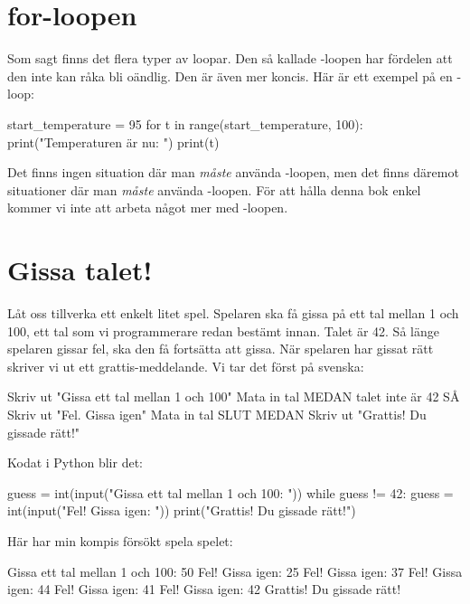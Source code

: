 \section{for-loopen}
Som sagt finns det flera typer av loopar. Den så kallade -loopen har fördelen att den inte kan råka bli oändlig. Den är även mer koncis. Här är ett exempel på en -loop:
\vspace{10pt}
\begin{python}
start_temperature = 95
for t in range(start_temperature, 100):
	print("Temperaturen är nu: ")
	print(t)
\end{python}

Det finns ingen situation där man \emph{måste} använda -loopen, men det finns däremot situationer där man \emph{måste} använda -loopen. För att hålla denna bok enkel kommer vi inte att arbeta något mer med -loopen.

\section{Gissa talet!}\label{subsec:gissa_talet1}
Låt oss tillverka ett enkelt litet spel. Spelaren ska få gissa på ett tal mellan 1 och 100, ett tal som vi programmerare redan bestämt innan. Talet är 42. Så länge spelaren gissar fel, ska den få fortsätta att gissa. När spelaren har gissat rätt skriver vi ut ett grattis-meddelande. Vi tar det först på svenska:

\begin{pseudo}
Skriv ut "Gissa ett tal mellan 1 och 100"
Mata in tal
MEDAN talet inte är 42 SÅ
   Skriv ut "Fel. Gissa igen"
   Mata in tal
SLUT MEDAN
Skriv ut "Grattis! Du gissade rätt!"
\end{pseudo}

Kodat i Python blir det:

\begin{python}[caption={Gissa talet},label={}]
guess = int(input("Gissa ett tal mellan 1 och 100: "))
while guess != 42:
    guess = int(input("Fel! Gissa igen: "))
print("Grattis! Du gissade rätt!")
\end{python}

Här har min kompis försökt spela spelet:

\vspace{10pt}
\begin{python}
Gissa ett tal mellan 1 och 100: 50
Fel! Gissa igen: 25
Fel! Gissa igen: 37
Fel! Gissa igen: 44
Fel! Gissa igen: 41
Fel! Gissa igen: 42
Grattis! Du gissade rätt!
\end{python}

